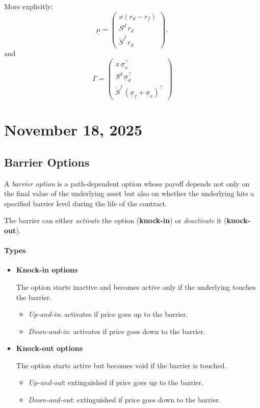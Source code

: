 \documentclass[12pt,a4paper]{article}
\theoremstyle{definition}
\begin{document}
More explicitly:
\[
\underline{\mu} = \begin{pmatrix}
x(r_d - r_f) \\
S^d\, r_d \\
\widetilde{S}^f\, r_d
\end{pmatrix},
\]
and
\[
\Gamma = \begin{pmatrix}
x\, \underline{\sigma}_x^\top \\
S^d\, \underline{\sigma}_d^\top \\
\widetilde{S}^f\, (\underline{\sigma}_f + \underline{\sigma}_x)^\top
\end{pmatrix}
\]

\newpage
\section{November 18, 2025}

\subsection{Barrier Options}

A \emph{barrier option} is a path-dependent option whose payoff depends not only on the final value of the underlying asset but also on whether the underlying hits a specified barrier level during the life of the contract.

The barrier can either \emph{activate} the option (\textbf{knock-in}) or \emph{deactivate} it (\textbf{knock-out}).

\paragraph{Types}

\begin{itemize}
\item \textbf{Knock-in options}

The option starts inactive and becomes active only if the underlying touches the barrier.
\begin{itemize}
\item \emph{Up-and-in}: activates if price goes up to the barrier.
\item \emph{Down-and-in}: activates if price goes down to the barrier.
\end{itemize}

\item \textbf{Knock-out options}

The option starts active but becomes void if the barrier is touched.
\begin{itemize}
\item \emph{Up-and-out}: extinguished if price goes up to the barrier.
\item \emph{Down-and-out}: extinguished if price goes down to the barrier.
\end{itemize}
\end{itemize}
\end{document}
